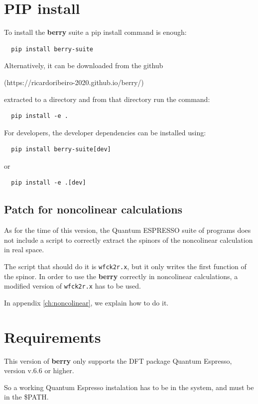 \documentclass[a4paper,12pt]{report}
\begin{document}
\section{PIP install}

To install the \textbf{berry} suite a pip install command is enough:
\begin{verbatim}
  pip install berry-suite
\end{verbatim}

Alternatively, it can be downloaded from the github

(https://ricardoribeiro-2020.github.io/berry/)

extracted to a directory and from that directory run the command:
\begin{verbatim}
  pip install -e .
\end{verbatim}

For developers, the developer dependencies can be installed using:
\begin{verbatim}
  pip install berry-suite[dev]
\end{verbatim}
or
\begin{verbatim}
  pip install -e .[dev]
\end{verbatim}

\subsection{Patch for noncolinear calculations}

As for the time of this version, the {\sc Quantum ESPRESSO} suite of programs
does not include a script to correctly extract the spinors of the noncolinear calculation
in real space.

The script that should do it is \verb*|wfck2r.x|, but it only writes the first function of the spinor.
In order to use the \textbf{berry} correctly in noncolinear calculations,
a modified version of \verb*|wfck2r.x| has to be used.

In appendix \ref{ch:noncolinear}, we explain how to do it.



\section{Requirements}

This version of \textbf{berry} only supports the DFT package {\sc Quantum Espresso}, version v.6.6 or higher.

So a working {\sc Quantum Espresso} instalation has to be in the system, and must be in the \$PATH.
\end{document}
